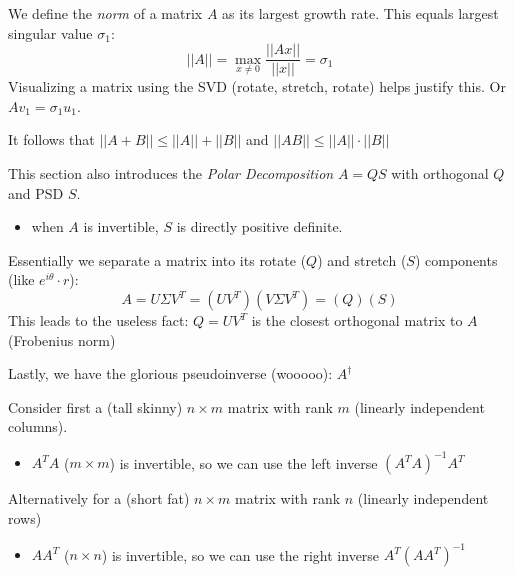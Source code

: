 \documentclass[12pt]{article} %
\begin{document}
\newpage
{}
We define the \emph{norm} of a matrix $A$ as its largest growth rate. This equals largest singular value $\sigma_1$:
\begin{equation*}
    ||A|| = \max_{x \neq 0} \frac{||Ax||}{||x||} = \sigma_1
\end{equation*}
Visualizing a matrix using the SVD (rotate, stretch, rotate) helps justify this. Or $Av_1 = \sigma_1 u_1$.

It follows that $||A + B|| \leq ||A|| + ||B||$ and $||AB|| \leq ||A|| \cdot ||B||$

\separate

This section also introduces the \emph{Polar Decomposition} $A = QS$ with orthogonal $Q$ and PSD $S$.
\begin{itemize}[topsep=-1pt,itemsep=-1pt]
    \item when $A$ is invertible, $S$ is directly positive definite.
\end{itemize}
Essentially we separate a matrix into its rotate ($Q$) and stretch ($S$) components (like $e^{i\theta} \cdot r$):
\begin{equation*}
    A = U \Sigma V^T = (UV^T)(V\Sigma V^T) = (Q)(S)
\end{equation*}
This leads to the useless fact: $Q = UV^T$ is the closest orthogonal matrix to $A$ (Frobenius norm)

\separate
Lastly, we have the glorious pseudoinverse (wooooo): $A^\dagger$

Consider first a (tall skinny) $n \times m$ matrix with rank $m$ (linearly independent columns).
\begin{itemize}[topsep=-1pt,itemsep=-1pt]
    \item $A^TA$ ($m\times m$) is invertible, so we can use the left inverse $(A^TA)^{-1}A^T$
\end{itemize}
Alternatively for a (short fat) $n\times m$ matrix with rank $n$ (linearly independent rows)
\begin{itemize}[topsep=-1pt,itemsep=-1pt]
    \item $AA^T$ ($n\times n$) is invertible, so we can use the right inverse $A^T(AA^T)^{-1}$
\end{itemize}
\end{document}
